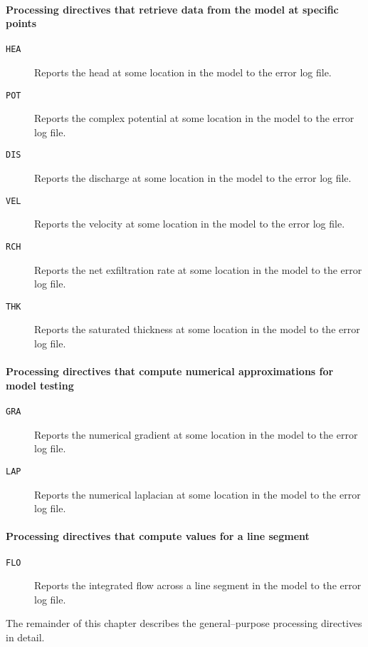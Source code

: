 \paragraph{Processing directives that retrieve data from the model at specific
points}
\begin{description}
\item [{\texttt{HEA}}] Reports the head at some location in the model to
the error log file.
\item [{\texttt{POT}}] Reports the complex potential at some location in
the model to the error log file.
\item [{\texttt{DIS}}] Reports the discharge at some location in the model
to the error log file.
\item [{\texttt{VEL}}] Reports the velocity at some location in the model
to the error log file.
\item [{\texttt{RCH}}] Reports the net exfiltration rate at some location
in the model to the error log file.
\item [{\texttt{THK}}] Reports the saturated thickness at some location
in the model to the error log file.
\end{description}

\paragraph{Processing directives that compute numerical approximations for model
testing}
\begin{description}
\item [{\texttt{GRA}}] Reports the numerical gradient at some location
in the model to the error log file.
\item [{\texttt{LAP}}] Reports the numerical laplacian at some location
in the model to the error log file.
\end{description}

\paragraph{Processing directives that compute values for a line segment}
\begin{description}
\item [{\texttt{FLO}}] Reports the integrated flow across a line segment
in the model to the error log file.
\end{description}
The remainder of this chapter describes the general--purpose processing
directives in detail.\newpage


